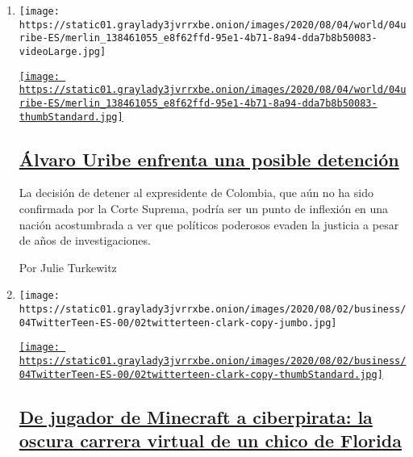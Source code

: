 \begin{enumerate}
\def\labelenumi{\arabic{enumi}.}
\item
  \texttt{[image: https://static01.graylady3jvrrxbe.onion/images/2020/08/04/world/04uribe-ES/merlin\_138461055\_e8f62ffd-95e1-4b71-8a94-dda7b8b50083-videoLarge.jpg]}

  \href{/es/2020/08/04/espanol/america-latina/alvaro-uribe-detencion-colombia.html}{\texttt{[image: https://static01.graylady3jvrrxbe.onion/images/2020/08/04/world/04uribe-ES/merlin\_138461055\_e8f62ffd-95e1-4b71-8a94-dda7b8b50083-thumbStandard.jpg]}}

  \hypertarget{uxe1lvaro-uribe-enfrenta-una-posible-detenciuxf3n}{%
  \subsection{\texorpdfstring{\href{/es/2020/08/04/espanol/america-latina/alvaro-uribe-detencion-colombia.html}{Álvaro
  Uribe enfrenta una posible
  detención}}{Álvaro Uribe enfrenta una posible detención}}\label{uxe1lvaro-uribe-enfrenta-una-posible-detenciuxf3n}}

  La decisión de detener al expresidente de Colombia, que aún no ha sido
  confirmada por la Corte Suprema, podría ser un punto de inflexión en
  una nación acostumbrada a ver que políticos poderosos evaden la
  justicia a pesar de años de investigaciones.

  Por Julie Turkewitz
\item
  \texttt{[image: https://static01.graylady3jvrrxbe.onion/images/2020/08/02/business/04TwitterTeen-ES-00/02twitterteen-clark-copy-jumbo.jpg]}

  \href{/es/2020/08/04/espanol/negocios/joven-florida-hacker-twitter.html}{\texttt{[image: https://static01.graylady3jvrrxbe.onion/images/2020/08/02/business/04TwitterTeen-ES-00/02twitterteen-clark-copy-thumbStandard.jpg]}}

  \hypertarget{de-jugador-de-minecraft-a-ciberpirata-la-oscura-carrera-virtual-de-un-chico-de-florida}{%
  \subsection{\texorpdfstring{\href{/es/2020/08/04/espanol/negocios/joven-florida-hacker-twitter.html}{De
  jugador de Minecraft a ciberpirata: la oscura carrera virtual de un
  chico de
  Florida}}{De jugador de Minecraft a ciberpirata: la oscura carrera virtual de un chico de Florida}}\label{de-jugador-de-minecraft-a-ciberpirata-la-oscura-carrera-virtual-de-un-chico-de-florida}}


\end{enumerate}
